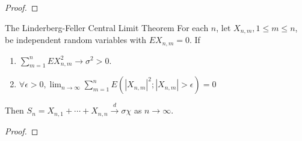 \begin{proof}
    
\end{proof}

\begin{theorem}{The Linderberg-Feller Central Limit Theorem}{}
    For each $n$, let $X_{n,m},1\leq m\leq n$, be independent random variables with $EX_{n,m}=0$. If
    \begin{enumerate}
        \item $\sum_{m=1}^{n}EX_{n,m}^{2} \rightarrow \sigma^{2}>0$.
        \item $\forall\epsilon>0,\lim_{n\rightarrow\infty}\sum_{m=1}^{n}E\left(\left|X_{n,m}\right|^{2};\left|X_{n,m}\right|>\epsilon\right)=0$
    \end{enumerate}
    Then $S_{n}=X_{n,1}+\cdots+X_{n,n}\stackrel{d}{\rightarrow}\sigma\chi$ as $n\rightarrow\infty$.
\end{theorem}

\begin{proof}
    
\end{proof}

